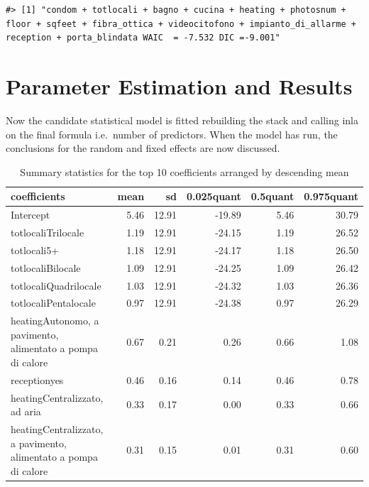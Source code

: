\documentclass[
  12pt,
  a4paper,
  oneside]{book}
\theoremstyle{definition}
\theoremstyle{definition}
\theoremstyle{definition}
\theoremstyle{remark}
\begin{document}
\begin{lstlisting}
#> [1] "condom + totlocali + bagno + cucina + heating + photosnum + floor + sqfeet + fibra_ottica + videocitofono + impianto_di_allarme + reception + porta_blindata WAIC  = -7.532 DIC =-9.001"
\end{lstlisting}

\hypertarget{fit}{%
\section{Parameter Estimation and Results}\label{fit}}

Now the candidate statistical model is fitted rebuilding the stack and calling inla on the final formula i.e.~number of predictors. When the model has run, the conclusions for the random and fixed effects are now discussed.

\begin{table}

\caption{\label{tab:modelfitting}Summary statistics for the top 10 coefficients arranged by descending mean}
\centering
\begin{tabular}[t]{lrrrrr}
\toprule
coefficients & mean & sd & 0.025quant & 0.5quant & 0.975quant\\
\midrule
Intercept & 5.46 & 12.91 & -19.89 & 5.46 & 30.79\\
totlocaliTrilocale & 1.19 & 12.91 & -24.15 & 1.19 & 26.52\\
totlocali5+ & 1.18 & 12.91 & -24.17 & 1.18 & 26.50\\
totlocaliBilocale & 1.09 & 12.91 & -24.25 & 1.09 & 26.42\\
totlocaliQuadrilocale & 1.03 & 12.91 & -24.32 & 1.03 & 26.36\\
\addlinespace
totlocaliPentalocale & 0.97 & 12.91 & -24.38 & 0.97 & 26.29\\
heatingAutonomo, a pavimento, alimentato a pompa di calore & 0.67 & 0.21 & 0.26 & 0.66 & 1.08\\
receptionyes & 0.46 & 0.16 & 0.14 & 0.46 & 0.78\\
heatingCentralizzato, ad aria & 0.33 & 0.17 & 0.00 & 0.33 & 0.66\\
heatingCentralizzato, a pavimento, alimentato a pompa di calore & 0.31 & 0.15 & 0.01 & 0.31 & 0.60\\
\bottomrule
\end{tabular}
\end{table}
\end{document}
